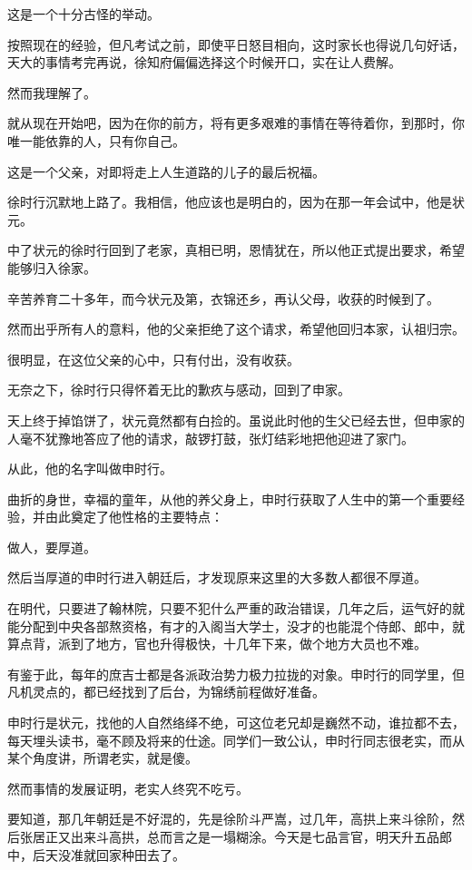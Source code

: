 \begin{multicols}{\theparacolNo}
这是一个十分古怪的举动。

按照现在的经验，但凡考试之前，即使平日怒目相向，这时家长也得说几句好话，天大的事情考完再说，徐知府偏偏选择这个时候开口，实在让人费解。

然而我理解了。

就从现在开始吧，因为在你的前方，将有更多艰难的事情在等待着你，到那时，你唯一能依靠的人，只有你自己。

这是一个父亲，对即将走上人生道路的儿子的最后祝福。

徐时行沉默地上路了。我相信，他应该也是明白的，因为在那一年会试中，他是状元。

中了状元的徐时行回到了老家，真相已明，恩情犹在，所以他正式提出要求，希望能够归入徐家。

辛苦养育二十多年，而今状元及第，衣锦还乡，再认父母，收获的时候到了。

然而出乎所有人的意料，他的父亲拒绝了这个请求，希望他回归本家，认祖归宗。

很明显，在这位父亲的心中，只有付出，没有收获。

无奈之下，徐时行只得怀着无比的歉疚与感动，回到了申家。

天上终于掉馅饼了，状元竟然都有白捡的。虽说此时他的生父已经去世，但申家的人毫不犹豫地答应了他的请求，敲锣打鼓，张灯结彩地把他迎进了家门。

从此，他的名字叫做申时行。

曲折的身世，幸福的童年，从他的养父身上，申时行获取了人生中的第一个重要经验，并由此奠定了他性格的主要特点：

做人，要厚道。

然后当厚道的申时行进入朝廷后，才发现原来这里的大多数人都很不厚道。

在明代，只要进了翰林院，只要不犯什么严重的政治错误，几年之后，运气好的就能分配到中央各部熬资格，有才的入阁当大学士，没才的也能混个侍郎、郎中，就算点背，派到了地方，官也升得极快，十几年下来，做个地方大员也不难。

有鉴于此，每年的庶吉士都是各派政治势力极力拉拢的对象。申时行的同学里，但凡机灵点的，都已经找到了后台，为锦绣前程做好准备。

申时行是状元，找他的人自然络绎不绝，可这位老兄却是巍然不动，谁拉都不去，每天埋头读书，毫不顾及将来的仕途。同学们一致公认，申时行同志很老实，而从某个角度讲，所谓老实，就是傻。

然而事情的发展证明，老实人终究不吃亏。

要知道，那几年朝廷是不好混的，先是徐阶斗严嵩，过几年，高拱上来斗徐阶，然后张居正又出来斗高拱，总而言之是一塌糊涂。今天是七品言官，明天升五品郎中，后天没准就回家种田去了。


\end{multicols}
